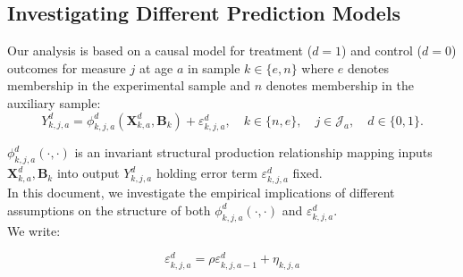 


\usepackage[stable]{footmisc}

\newcommand*\leftright[2]{%
  \leavevmode
  \rlap{#1}%
  \hspace{0.5\linewidth}%
  #2}

\newcommand{\orth}{\ensuremath{\perp\!\!\!\perp}}%
\newcommand{\indep}{\orth}%
\newcommand{\notorth}{\ensuremath{\perp\!\!\!\!\!\!\diagup\!\!\!\!\!\!\perp}}%
\newcommand{\notindep}{\notorth}







\doublespacing

\subsection{Investigating Different Prediction Models} \label{appendix:predmodels}

\noindent Our analysis is based on a causal model for treatment ($d=1$) and control ($d=0$) outcomes for measure $j$ at age $a$ in sample $k \in \{e,n\}$ where $e$ denotes membership in the experimental sample and $n$ denotes membership in the auxiliary sample:\\

\begin{equation}\label{eq:outcome}
Y^d_{k,j,a} = \phi^d_{k,j,a} (\bm{X}^d_{k,a}, \bm{B}_k) + \varepsilon^d_{k,j,a}, \quad k \in \{n,e\}, \quad j \in \mathcal{J}_a, \quad d \in \{0, 1\}.
\end{equation}

\noindent $\phi^d_{k,j,a}\left( \cdot, \cdot \right)$ is an invariant structural production relationship mapping inputs $\bm{X}^d_{k,a}, \bm{B}_k$ into output $Y^d_{k,j,a}$ holding error term $\varepsilon^d_{k,j,a}$ fixed.\\ 

\noindent In this document, we investigate the empirical implications of different assumptions on the structure of both $\phi_{k,j,a}^d \left( \cdot, \cdot \right)$ and $\varepsilon_{k,j,a}^d$.\\ 

\noindent We write: 

\begin{equation}
\varepsilon^d_{k,j,a} = \rho \varepsilon^d_{k,j,{a-1}} + \eta_{k,j,{a}} \label{eq:error}
\end{equation}


